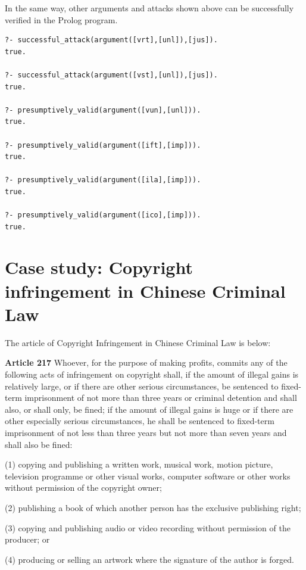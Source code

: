 \documentclass{IOS-Book-Article}
\begin{document}
In the same way, other arguments and attacks shown above can be successfully verified in the Prolog program.
\begin{lstlisting}
?- successful_attack(argument([vrt],[unl]),[jus]).
true.

?- successful_attack(argument([vst],[unl]),[jus]).
true.

?- presumptively_valid(argument([vun],[unl])).
true.

?- presumptively_valid(argument([ift],[imp])).
true.

?- presumptively_valid(argument([ila],[imp])).
true.

?- presumptively_valid(argument([ico],[imp])).
true.
\end{lstlisting}


\section{Case study: Copyright infringement in Chinese Criminal Law}




\noindent The article of Copyright Infringement in Chinese Criminal Law\cite{StateCouncil2015series} is below:
\newline

\begin{adjustwidth}{0.5cm}{0cm}
\noindent \textbf{Article 217} Whoever, for the purpose of making profits, commits any of the following acts of infringement on copyright shall, if the amount of illegal gains is relatively large, or if there are other serious circumstances, be sentenced to fixed-term imprisonment of not more than three years or criminal detention and shall also, or shall only, be fined; if the amount of illegal gains is huge or if there are other especially serious circumstances, he shall be sentenced to fixed-term imprisonment of not less than three years but not more than seven years and shall also be fined:

\noindent (1) copying and publishing a written work, musical work, motion picture, television programme or other visual works, computer software or other works without permission of the copyright owner;

\noindent (2) publishing a book of which another person has the exclusive publishing right;

\noindent (3) copying and publishing audio or video recording without permission of the producer; or

\noindent (4) producing or selling an artwork where the signature of the author is forged.\newline
\end{adjustwidth}
\end{document}

